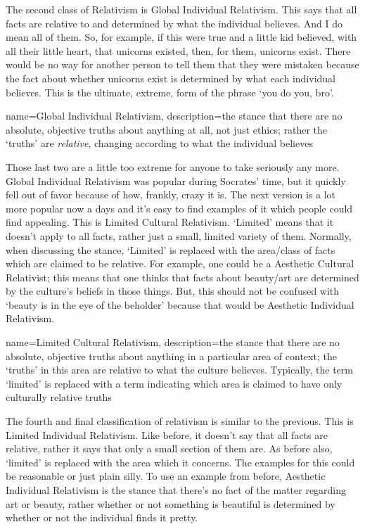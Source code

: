 The second class of Relativism is \gls{Global Individual Relativism}. This says that all facts are relative to and determined by what the individual believes. And I do mean all of them. So, for example, if this were true and a little kid believed, with all their little heart, that unicorns existed, then, for them, unicorns exist. There would be no way for another person to tell them that they were mistaken because the fact about whether unicorns exist is determined by what each individual believes. This is the ultimate, extreme, form of the phrase `you do you, bro'.

{
  name=Global Individual Relativism,
  description={the stance that there are no absolute, objective truths about anything at all, not just ethics; rather the `truths' are \emph{relative}, changing according to what the individual believes}
}


Those last two are a little too extreme for anyone to take seriously any more. Global Individual Relativism was popular during Socrates' time, but it quickly fell out of favor because of how, frankly, crazy it is. The next version is a lot more popular now a days and it's easy to find examples of it which people could find appealing. This is \gls{Limited Cultural Relativism}. `Limited' means that it doesn't apply to all facts, rather just a small, limited variety of them. Normally, when discussing the stance, `Limited' is replaced with the area/class of facts which are claimed to be relative. For example, one could be a Aesthetic Cultural Relativist; this means that one thinks that facts about beauty/art are determined by the culture's beliefs in those things. But, this should not be confused with `beauty is in the eye of the beholder' because that would be Aesthetic Individual Relativism. 

{
  name=Limited Cultural Relativism,
  description={the stance that there are no absolute, objective truths about anything in a particular area of context; the `truths' in this area are relative to what the culture believes. Typically, the term `limited' is replaced with a term indicating which area is claimed to have only culturally relative truths}
}


The fourth and final classification of relativism is similar to the previous. This is Limited Individual Relativism. Like before, it doesn't say that all facts are relative, rather it says that only a small section of them are. As before also, `limited' is replaced with the area which it concerns. The examples for this could be reasonable or just plain silly.  To use an example from before, Aesthetic Individual Relativism is the stance that there's no fact of the matter regarding art or beauty, rather whether or not something is beautiful is determined by whether or not the individual finds it pretty.

